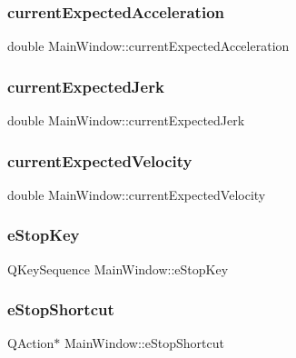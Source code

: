 \subsubsection{\texorpdfstring{current\+Expected\+Acceleration}{currentExpectedAcceleration}}
{\footnotesize\ttfamily double Main\+Window\+::current\+Expected\+Acceleration}

\hypertarget{class_main_window_a380cbb9e901211a3c8fc685cea11c8f9}{}\label{class_main_window_a380cbb9e901211a3c8fc685cea11c8f9} 
\subsubsection{\texorpdfstring{current\+Expected\+Jerk}{currentExpectedJerk}}
{\footnotesize\ttfamily double Main\+Window\+::current\+Expected\+Jerk}

\hypertarget{class_main_window_a879db4d65600c3b3945d67976d9a8622}{}\label{class_main_window_a879db4d65600c3b3945d67976d9a8622} 
\subsubsection{\texorpdfstring{current\+Expected\+Velocity}{currentExpectedVelocity}}
{\footnotesize\ttfamily double Main\+Window\+::current\+Expected\+Velocity}

\hypertarget{class_main_window_ad869af059f93289fa358e55d881d20a0}{}\label{class_main_window_ad869af059f93289fa358e55d881d20a0} 
\subsubsection{\texorpdfstring{e\+Stop\+Key}{eStopKey}}
{\footnotesize\ttfamily Q\+Key\+Sequence Main\+Window\+::e\+Stop\+Key}

\hypertarget{class_main_window_a0efaeedddca035b6a26ebf229b4ce6ae}{}\label{class_main_window_a0efaeedddca035b6a26ebf229b4ce6ae} 
\subsubsection{\texorpdfstring{e\+Stop\+Shortcut}{eStopShortcut}}
{\footnotesize\ttfamily Q\+Action$\ast$ Main\+Window\+::e\+Stop\+Shortcut}

